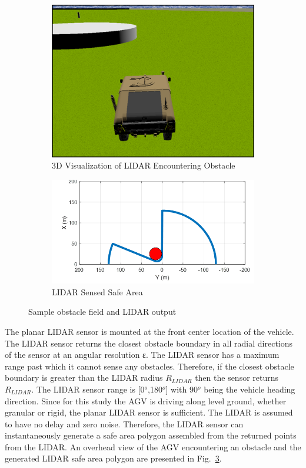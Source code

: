 \documentclass[12pt,twocolumn]{article}
\begin{document}
\begin{figure}
	\centering
	\begin{subfigure}[b]{\columnwidth}
		\centering
		\includegraphics[width=0.8\columnwidth]{Figs/incomingObst.png}
		\caption{{\small 3D Visualization of LIDAR Encountering Obstacle}}   
		\label{fig:obstacle_field_3D}
	\end{subfigure}

	\hfill
	\begin{subfigure}[b]{\columnwidth}
		\centering
		\includegraphics[width=\columnwidth]{Figs/obstLIDAR.png}
		\caption{\small LIDAR Sensed Safe Area}   
		\label{fig:obstacle_field_LIDAR}
	\end{subfigure}
	\caption{\small Sample obstacle field and LIDAR output}
	\label{fig:LIDARExample}
\end{figure}

The planar LIDAR sensor is mounted at the front center location of the vehicle. The LIDAR sensor returns the closest obstacle boundary in all radial directions of the sensor at an angular resolution ε. The LIDAR sensor has a maximum range past which it cannot sense any obstacles. Therefore, if the closest obstacle boundary is greater than the LIDAR radius $R_{LIDAR}$ then the sensor returns $R_{LIDAR}$. The LIDAR sensor range is [0$^o$,180$^o$] with 90$^o$ being the vehicle heading direction. Since for this study the AGV is driving along level ground, whether granular or rigid, the planar LIDAR sensor is sufficient. The LIDAR is assumed to have no delay and zero noise. Therefore, the LIDAR sensor can instantaneously generate a safe area polygon assembled from the returned points from the LIDAR. An overhead view of the AGV encountering an obstacle and the generated LIDAR safe area polygon are presented in Fig.~\ref{fig:LIDARExample}. 
%
\end{document}
